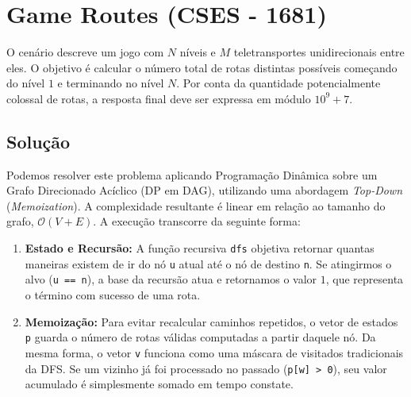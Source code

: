 \documentclass[12pt,a4paper]{article}
\begin{document}
\newpage

\section{Game Routes (CSES - 1681)}
O cenário descreve um jogo com $N$ níveis e $M$ teletransportes unidirecionais entre eles. O objetivo é calcular o número total de rotas distintas possíveis começando do nível $1$ e terminando no nível $N$. Por conta da quantidade potencialmente colossal de rotas, a resposta final deve ser expressa em módulo $10^9 + 7$.

\subsection{Solução}
Podemos resolver este problema aplicando Programação Dinâmica sobre um Grafo Direcionado Acíclico (DP em DAG), utilizando uma abordagem \textit{Top-Down} (\textit{Memoization}). A complexidade resultante é linear em relação ao tamanho do grafo, $\mathcal{O}(V + E)$. A execução transcorre da seguinte forma:

\begin{enumerate}
    \item \textbf{Estado e Recursão:} A função recursiva \texttt{dfs} objetiva retornar quantas maneiras existem de ir do nó \texttt{u} atual até o nó de destino \texttt{n}. Se atingirmos o alvo (\texttt{u == n}), a base da recursão atua e retornamos o valor $1$, que representa o término com sucesso de uma rota.
    \item \textbf{Memoização:} Para evitar recalcular caminhos repetidos, o vetor de estados \texttt{p} guarda o número de rotas válidas computadas a partir daquele nó. Da mesma forma, o vetor \texttt{v} funciona como uma máscara de visitados tradicionais da DFS. Se um vizinho já foi processado no passado (\texttt{p[w] > 0}), seu valor acumulado é simplesmente somado em tempo constate.
\end{enumerate}
\end{document}
